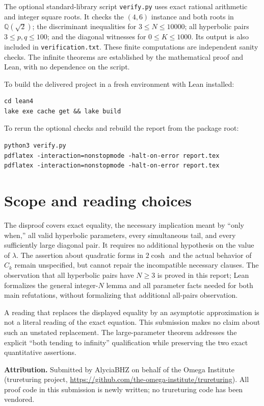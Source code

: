 \documentclass[11pt]{article}
\begin{document}
The optional standard-library script \texttt{verify.py} uses exact rational
arithmetic and integer square roots. It checks the $(4,6)$ instance and both
roots in $\mathbb Q(\sqrt2)$; the discriminant inequalities for
$3\le N\le10000$; all hyperbolic pairs $3\le p,q\le100$; and the diagonal
witnesses for $0\le K\le1000$. Its output is also included in
\texttt{verification.txt}. These finite computations are independent sanity
checks. The infinite theorems are established by the mathematical proof
and Lean, with no dependence on the script.

To build the delivered project in a fresh environment with Lean installed:
\begin{lstlisting}
cd lean4
lake exe cache get && lake build
\end{lstlisting}
To rerun the optional checks and rebuild the report from the package root:
\begin{lstlisting}
python3 verify.py
pdflatex -interaction=nonstopmode -halt-on-error report.tex
pdflatex -interaction=nonstopmode -halt-on-error report.tex
\end{lstlisting}

\section{Scope and reading choices}
The disproof covers exact equality, the necessary implication meant by
``only when,'' all valid hyperbolic parameters, every simultaneous tail,
and every sufficiently large diagonal pair. It requires no additional
hypothesis on the value of $\lambda$. The assertion about quadratic forms
in $2\cosh$ and the actual behavior of $C_k$ remain unspecified, but cannot
repair the incompatible necessary clauses. The observation that all
hyperbolic pairs have $N\ge3$ is proved in this report; Lean formalizes the
general integer-$N$ lemma and all parameter facts needed for both main
refutations, without formalizing that additional all-pairs observation.

A reading that replaces the displayed equality by an asymptotic approximation
is not a literal reading of the exact equation. This submission makes no
claim about such an unstated replacement. The large-parameter theorem
addresses the explicit ``both tending to infinity'' qualification while
preserving the two exact quantitative assertions.

\medskip
\noindent\textbf{Attribution.} Submitted by AlyciaBHZ on behalf of the Omega
Institute (trureturing project,
\url{https://github.com/the-omega-institute/trureturing}).
All proof code in this submission is newly written; no trureturing code
has been vendored.
\end{document}
